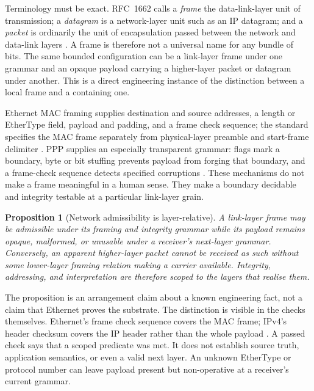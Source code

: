 \documentclass[11pt,a4paper]{article}
\newtheorem{proposition}[definition]{Proposition}
\theoremstyle{remark}\newtheorem{remark}[definition]{Remark}
\begin{document}
Terminology must be exact. RFC~1662 calls a \emph{frame} the data-link-layer unit
of transmission; a \emph{datagram} is a network-layer unit such as an IP
datagram; and a \emph{packet} is ordinarily the unit of encapsulation passed
between the network and data-link layers \citep{simpson1994}. A frame is therefore
not a universal name for any bundle of bits. The same bounded configuration can
be a link-layer frame under one grammar and an opaque payload carrying a
higher-layer packet or datagram under another. This is a direct engineering
instance of the distinction between a local frame and a containing one.

Ethernet MAC framing supplies destination and source addresses, a length or
EtherType field, payload and padding, and a frame check sequence; the standard
specifies the MAC frame separately from physical-layer preamble and start-frame
delimiter \citep{ieee8023}. PPP supplies an especially transparent grammar: flags
mark a boundary, byte or bit stuffing prevents payload from forging that boundary,
and a frame-check sequence detects specified corruptions \citep{simpson1994}.
These mechanisms do not make a frame meaningful in a human sense. They make a
boundary decidable and integrity testable at a particular link-layer grain.

\begin{proposition}[Network admissibility is layer-relative]\label{prop:network-layered}
A link-layer frame may be admissible under its framing and integrity grammar while
its payload remains opaque, malformed, or unusable under a receiver's next-layer
grammar. Conversely, an apparent higher-layer packet cannot be received as such
without some lower-layer framing relation making a carrier available. Integrity,
addressing, and interpretation are therefore scoped to the layers that realise
them.
\end{proposition}

The proposition is an arrangement claim about a known engineering fact, not a
claim that Ethernet proves the substrate. The distinction is visible in the
checks themselves. Ethernet's frame check sequence covers the MAC frame; IPv4's
header checksum covers the IP header rather than the whole payload
\citep{ieee8023,postel1981}. A passed check says that a scoped predicate was met.
It does not establish source truth, application semantics, or even a valid next
layer. An unknown EtherType or protocol number can leave payload present but
non-operative at a receiver's current grammar.
\end{document}
